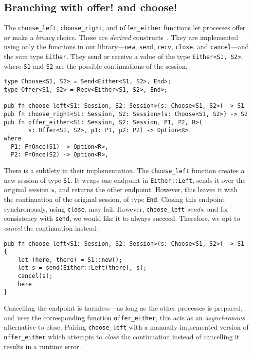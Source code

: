 \documentclass[copyright,creativecommons]{eptcs}
\begin{document}
\subsection{Branching with offer! and choose!}\label{sec:choice}
The \lstinline{choose_left}, \lstinline{choose_right}, and \lstinline{offer_either} functions let processes offer or make a \emph{binary} choice. These are \emph{derived} constructs~\cite{honda1993,dardha2017}. They are implemented using only the functions in our library---\lstinline{new}, \lstinline{send}, \lstinline{recv}, \lstinline{close}, and \lstinline{cancel}---and the sum type \lstinline{Either}. They send or receive a value of the type \lstinline{Either<S1, S2>}, where \lstinline{S1} and \lstinline{S2} are the possible continuations of the session.
\begin{lstlisting}
type Choose<S1, S2> = Send<Either<S1, S2>, End>;
type Offer<S1, S2> = Recv<Either<S1, S2>, End>;

pub fn choose_left<S1: Session, S2: Session>(s: Choose<S1, S2>) -> S1
pub fn choose_right<S1: Session, S2: Session>(s: Choose<S1, S2>) -> S2
pub fn offer_either<S1: Session, S2: Session, P1, P2, R>(
       s: Offer<S1, S2>, p1: P1, p2: P2) -> Option<R>
where
  P1: FnOnce(S1) -> Option<R>,
  P2: FnOnce(S2) -> Option<R>,
\end{lstlisting}
There is a subtlety in their implementation. The \lstinline{choose_left} function creates a new session of type \lstinline{S1}. It wraps one endpoint in \lstinline{Either::Left}, sends it over the original session \lstinline{s}, and returns the other endpoint. However, this leaves it with the continuation of the original session, of type \lstinline{End}. Closing this endpoint synchronously, using \lstinline{close}, may fail. However, \lstinline{choose_left} \emph{sends}, and for consistency with \lstinline{send}, we would like it to always succeed. Therefore, we opt to \emph{cancel} the continuation instead:
\begin{lstlisting}
pub fn choose_left<S1: Session, S2: Session>(s: Choose<S1, S2>) -> S1 {
    let (here, there) = S1::new();
    let s = send(Either::Left(there), s);
    cancel(s);
    here
}
\end{lstlisting}
Cancelling the endpoint is harmless---as long as the other processes is prepared, and uses the corresponding function \lstinline{offer_either}, this acts as an \emph{asynchronous} alternative to close. Pairing \lstinline{choose_left} with a manually implemented version of \lstinline{offer_either} which attempts to \emph{close} the continuation instead of cancelling it results in a runtime error.
\end{document}
